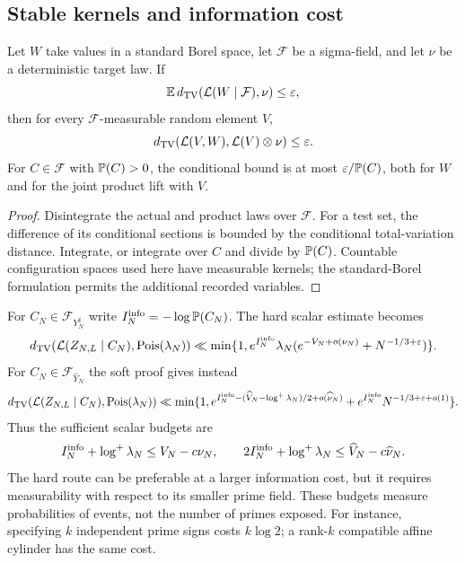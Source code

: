 \subsection{Stable kernels and information cost}
\begin{lemma}\label{lem:stable-lift}
Let $W$ take values in a standard Borel space, let $\mathcal F$ be a
sigma-field, and let $\nu$ be a deterministic target law. If
\[
 \mathbb E\,d_{\mathrm{TV}}(\mathcal L(W\mid\mathcal F),\nu)\le\varepsilon,
\]
then for every $\mathcal F$-measurable random element $V$,
\[
 d_{\mathrm{TV}}(\mathcal L(V,W),\mathcal L(V)\otimes\nu)\le\varepsilon.
\]
For $C\in\mathcal F$ with $\mathbb P(C)>0$, the conditional bound is at most
$\varepsilon/\mathbb P(C)$, both for $W$ and for the joint product lift with $V$.
\end{lemma}
\begin{proof}
Disintegrate the actual and product laws over $\mathcal F$. For a test set,
the difference of its conditional sections is bounded by the conditional
total-variation distance. Integrate, or integrate over $C$ and divide by
$\mathbb P(C)$. Countable configuration spaces used here have measurable kernels;
the standard-Borel formulation permits the additional recorded variables.
\end{proof}

For $C_N\in\mathcal F_{Y_N^\sharp}$ write
$I_N^{\rm info}=-\log\mathbb P(C_N)$. The hard scalar estimate becomes
\begin{equation}\label{eq:hard-conditioned}
 d_{\mathrm{TV}}(\mathcal L(Z_{N,L}\mid C_N),\operatorname{Pois}(\lambda_N))
 \ll \min\{1,e^{I_N^{\rm info}}\lambda_N
           (e^{-V_N+o(\nu_N)}+N^{-1/3+\varepsilon})\}.
\end{equation}
For $C_N\in\mathcal F_{\widehat Y_N}$ the soft proof gives instead
\begin{equation}\label{eq:soft-conditioned}
 d_{\mathrm{TV}}(\mathcal L(Z_{N,L}\mid C_N),\operatorname{Pois}(\lambda_N))
 \ll\min\{1,e^{I_N^{\rm info}-(\widehat V_N-\log^+\lambda_N)/2
                         +o(\widehat\nu_N)}
              +e^{I_N^{\rm info}}N^{-1/3+\varepsilon+o(1)}\}.
\end{equation}
Thus the sufficient scalar budgets are
\[
 I_N^{\rm info}+\log^+\lambda_N\le V_N-c\nu_N,
 \qquad
 2I_N^{\rm info}+\log^+\lambda_N\le\widehat V_N-c\widehat\nu_N.
\]
The hard route can be preferable at a larger information cost, but it
requires measurability with respect to its smaller prime field. These
budgets measure probabilities of events, not the number of primes exposed.
For instance, specifying $k$ independent prime signs costs $k\log2$;
a rank-$k$ compatible affine cylinder has the same cost.

